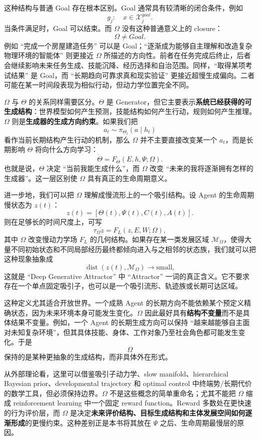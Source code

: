 这种结构与普通 Goal 存在根本区别。Goal 通常具有较清晰的闭合条件，例如
\[
g_j:
\quad
x\in\mathcal X_j^{goal}.
\]
当条件满足时，Goal 可以结束。而 $\Omega$ 没有这种普通意义上的 closure：
\[
\Omega
\neq
Goal.
\]
例如 ``完成一个房屋建造任务'' 可以是 Goal；``逐渐成为能够自主理解和改造复杂物理环境的智能体'' 则更接近 $\Omega$ 所描述的方向性。前者在任务完成后终止，后者会继续影响未来任务生成、技能沉降、经历选择和自治范围。同样，``取得某项考试结果'' 是 Goal，而 ``长期趋向可靠求真和现实验证'' 更接近超慢生成偏向。二者可能在某一时间段表现为相似行动，但动力学位置完全不同。

$\Omega$ 与 $\Theta$ 的关系同样需要区分。$\Theta$ 是 Generator，但它主要表示\textbf{系统已经获得的可生成结构}：世界模型如何产生预测，技能结构如何产生行动，规则如何产生推理。$\Omega$ 则是\textbf{生成器的生成方向约束}。如果我们把
\[
a_t
\sim
\pi_{\Theta_t}(a\mid h_t)
\]
看作当前长期结构产生行动的机制，那么 $\Omega$ 并不主要直接改变某一个 $a_t$，而是长期影响 $\Theta$ 将向什么方向学习：
\[
\dot{\Theta}
=
F_{\Theta}
(E,h,\Psi;\Omega).
\]
也就是说，$\Theta$ 决定 ``当前我能生成什么''，而 $\Omega$ 改变 ``未来的我将逐渐拥有怎样的生成器''。这一层区别使 $\Omega$ 具有真正的生命周期意义。

进一步地，我们可以把 $\Omega$ 理解成慢流形上的一个吸引结构。设 Agent 的生命周期慢状态为 $z(t)$：
\[
z(t)
=
[\Theta(t),\Psi(t),C(t),A(t)].
\]
则在足够长的时间尺度上，可写
\[
\tau_{\Omega}\dot z
=
F_L(z,E,W;\Omega),
\]
其中 $\Omega$ 改变慢动力学场 $F_L$ 的几何结构。如果存在某一类发展区域 $\mathcal M_{\Omega}$，使得大量不同初始状态和不同局部经历最终都倾向进入与之相邻的状态族，我们就可以把这种现象抽象成
\[
\operatorname{dist}
\left(
z(t),\mathcal M_{\Omega}
\right)
\rightarrow
\text{small},
\]
这就是 ``Deep Generative Attractor'' 中 ``Attractor'' 一词的真正含义。它不要求存在一个单点固定吸引子，也可以是一个吸引流形、轨迹族或长期可达区域。

这种定义尤其适合开放世界。一个成熟 Agent 的长期方向不能依赖某个预定义精确状态，因为未来环境本身可能发生变化。$\Omega$ 因此最好具有\textbf{结构不变量}而不是具体结果不变量。例如，一个 Agent 的长期生成方向可以保持 ``越来越能够自主面对未知复杂环境''，但其具体技能、身体、工作对象乃至社会角色都可能发生变化。于是
\[
\Omega
\]
保持的是某种更抽象的生成结构，而非具体外在形式。

从外部理论看，这里可以借鉴吸引子动力学、slow manifold、hierarchical Bayesian prior、developmental trajectory 和 optimal control 中终端势/长期代价的数学工具，但必须保持边界。$\Omega$ 不是这些概念的简单重命名；尤其不能把 $\Omega$ 缩成 reinforcement learning 中一个固定 reward function。Reward 多数处在更快速的行为评价层，而 $\Omega$ 是决定\textbf{未来评价结构、目标生成结构和主体发展空间如何逐渐形成}的更慢约束。这种差别正是本书将其放在 $\Psi$ 之后、生命周期最慢层的原因。

